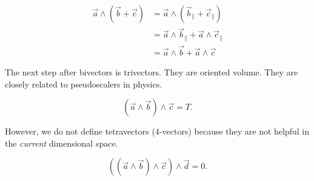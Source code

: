 \begin{align*}
    \vec{a} \wedge ( \vec{b} + \vec{c} ) &= \vec{a} \wedge (\vec{b}_\parallel + \vec{c}_\parallel) \\
                                         &= \vec{a} \wedge \vec{b}_\parallel + \vec{a} \wedge \vec{c}_\parallel \\
                                         &= \vec{a} \wedge \vec{b} + \vec{a} \wedge \vec{c}
\end{align*}

The next step after bivectors is trivectors. They are oriented volume. They are closely related to pseudoscalers in physics.

\[
( \vec{a} \wedge \vec{b} ) \wedge  \vec{c} = T
.\]

However, we do not define tetravectors (4-vectors) because they are not helpful in the \textit{current} dimensional space.

\[
    ( ( \vec{a} \wedge \vec{b} ) \wedge  \vec{c} ) \wedge \vec{d} = 0
.\] 































\newpage
